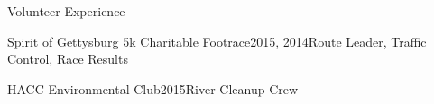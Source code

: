 \documentclass{resume} %
\begin{document}

\iffalse
\begin{rSection}{Volunteer Experience}

\iffalse
\begin{rWorkSubsection}{Lucky Orphans Horse Rescue}{2019}{}{}
\item Haven't started yet
\end{rWorkSubsection}


\begin{rWorkSubsection}{Rail Trail}{2019}{}{}
\item Haven't started yet
\end{rWorkSubsection}


\begin{rWorkSubsection}{HOPE Program Canine Rehabilitation}{2013}{Dog Handler}{}
\item Worked with professional dog trainer to train, care for, and rehabilitate unadoptable dogs, preparing them to be placed in permanent homes
\end{rWorkSubsection}
\fi

\begin{rVolunteerCondensed}{Spirit of Gettysburg 5k Charitable Footrace}{2015, 2014}{Route Leader, Traffic Control, Race Results}{}
\end{rVolunteerCondensed}


\begin{rVolunteerCondensed}{HACC Environmental Club}{2015}{River Cleanup Crew}{}
\end{rVolunteerCondensed}


\end{rSection}
\end{document}
